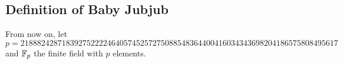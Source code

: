 \documentclass{article}
\begin{document}
\begin{spacing}{1.2}
%	
%
%	
%
%	
%	
%	
%	
%	


	\subsection{Definition of Baby Jubjub} 	
	From now on, let 
		$$	p = 21888242871839275222246405745257275088548364
				400416034343698204186575808495617 $$
	and $\mathbb{F}_p$ the finite field with $p$ elements. 
	

\end{spacing}
\end{document}

